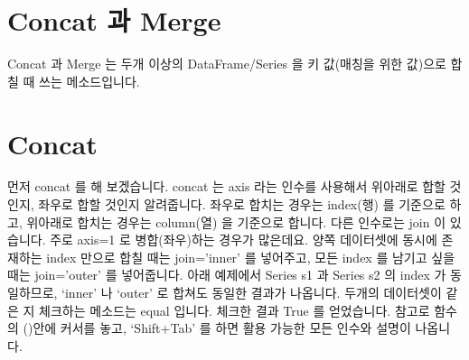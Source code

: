\documentclass[letterpaper,10pt,english]{jupyterBook}
\begin{document}
\section{Concat 과 Merge}
\label{\detokenize{chapter2/2.2.2_Useful_Techniques:concat-merge}}\label{\detokenize{chapter2/2.2.2_Useful_Techniques::doc}}
\sphinxAtStartPar
Concat 과 Merge 는 두개 이상의 DataFrame/Series 을 키 값(매칭을 위한 값)으로 합칠 때 쓰는 메소드입니다.


\section{Concat}
\label{\detokenize{chapter2/2.2.2_Useful_Techniques:concat}}
\sphinxAtStartPar
먼저 concat 를 해 보겠습니다. concat 는 axis 라는 인수를 사용해서 위\sphinxhyphen{}아래로 합할 것인지, 좌\sphinxhyphen{}우로 합할 것인지 알려줍니다. 좌\sphinxhyphen{}우로 합치는 경우는 index(행) 를 기준으로 하고, 위\sphinxhyphen{}아래로 합치는 경우는 column(열) 을 기준으로 합니다. 다른 인수로는 join 이 있습니다. 주로 axis=1 로 병합(좌\sphinxhyphen{}우)하는 경우가 많은데요. 양쪽 데이터셋에 동시에 존재하는 index 만으로 합칠 때는 join=’inner’ 를 넣어주고, 모든 index 를 남기고 싶을 때는 join=’outer’ 를 넣어줍니다. 아래 예제에서 Series s1 과 Series s2 의 index 가 동일하므로, ‘inner’ 나 ‘outer’ 로 합쳐도 동일한 결과가 나옵니다. 두개의 데이터셋이 같은 지 체크하는 메소드는 equal 입니다. 체크한 결과 True 를 얻었습니다. 참고로 함수의 ()안에 커서를 놓고, ‘Shift+Tab’ 를 하면 활용 가능한 모든 인수와 설명이 나옵니다.
\end{document}

